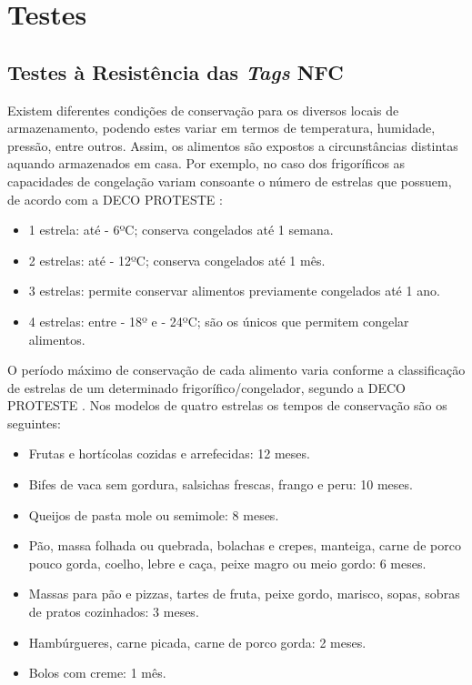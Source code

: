 %
%
\section{Testes}\label{sec35}

\subsection{Testes à Resistência das \textit{Tags} NFC}\label{subsec351}

Existem diferentes condições de conservação para os diversos locais de armazenamento, podendo estes variar em termos de temperatura, humidade, pressão, entre outros. Assim, os alimentos são expostos a circunstâncias distintas aquando armazenados em casa. Por exemplo, no caso dos frigoríficos as capacidades de congelação variam consoante o número de estrelas que possuem, de acordo com a DECO PROTESTE \cite{deco:fridgeStarsClassification}:

\begin{itemize}
    \item 1 estrela: até - 6ºC; conserva congelados até 1 semana.
    \item 2 estrelas: até - 12ºC; conserva congelados até 1 mês.
    \item 3 estrelas: permite conservar alimentos previamente congelados até 1 ano.
    \item 4 estrelas: entre - 18º e - 24ºC; são os únicos que permitem congelar alimentos.
\end{itemize}

O período máximo de conservação de cada alimento varia conforme a classificação de estrelas de um determinado frigorífico/congelador, segundo a DECO PROTESTE \cite{deco:conservationTimeByProduct}. Nos modelos de quatro estrelas os tempos de conservação são os seguintes: 
\begin{itemize}
    \item Frutas e hortícolas cozidas e arrefecidas: 12 meses.
    \item Bifes de vaca sem gordura, salsichas frescas, frango e peru: 10 meses.
    \item Queijos de pasta mole ou semimole: 8 meses.
    \item Pão, massa folhada ou quebrada, bolachas e crepes, manteiga, carne de porco pouco gorda, coelho, lebre e caça, peixe magro ou meio gordo: 6 meses.
    \item Massas para pão e pizzas, tartes de fruta, peixe gordo, marisco, sopas, sobras de pratos cozinhados: 3 meses.
    \item Hambúrgueres, carne picada, carne de porco gorda: 2 meses.
    \item Bolos com creme: 1 mês.
\end{itemize}

